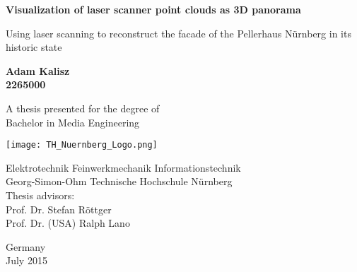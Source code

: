 \begin{titlepage}
	\begin{center}
		\vspace*{1cm}
		
		\Huge
		\textbf{Visualization of laser scanner point clouds as 3D panorama}
		
		\vspace{0.5cm}
		\LARGE
		Using laser scanning to reconstruct the facade of the Pellerhaus Nürnberg in its historic state
		
		\vspace{1.5cm}
		
		\textbf{Adam Kalisz}\\
		\textbf{2265000}\\
		
		\vspace{1.5cm}
				
		
		A thesis presented for the degree of\\
		Bachelor in Media Engineering
		
		\vfill
		
		\vspace{0.8cm}
		
		{\texttt{[image: TH\_Nuernberg\_Logo.png]}}
		
		\Large
		Elektrotechnik Feinwerkmechanik Informationstechnik\\
		Georg-Simon-Ohm Technische Hochschule Nürnberg\\
		
		\vspace{0.8cm}
		Thesis advisors:\\
		Prof. Dr. Stefan Röttger\\
		Prof. Dr. (USA) Ralph Lano\\	
		\vspace{0.8cm}
		
		
		Germany\\
		July 2015
		
		
		
	\end{center}
\end{titlepage}